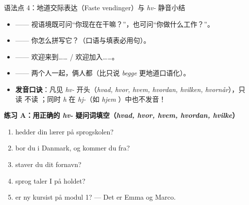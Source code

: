 \begin{grammatikbox}{语法点 4：地道交际表达（Faste vendinger）与 \textit{hv-} 静音小结}
\begin{itemize}
  \item {} —— 视语境既可问“你现在在干嘛？”，也可问“你做什么工作？”。
  \item {} —— 你怎么拼写它？（口语与填表必用句）。
  \item {} —— 欢迎来到…… / 欢迎加入……。
  \item {} —— 两个人一起，俩人都（比只说 \textit{begge} 更地道口语化）。
  \item \textbf{发音口诀}：凡见 \textit{hv-} 开头（\textit{hvad, hvor, hvem, hvordan, hvilken, hvornår}），只读  不读 ；同时 \textit{h} 在 \textit{hj-}（如 \textit{hjem} ）中也不发音！
\end{itemize}
\end{grammatikbox}


\textbf{练习 A：用正确的 \textit{hv-} 疑问词填空（\textit{hvad, hvor, hvem, hvordan, hvilke}）}
\begin{enumerate}
  \item \underline{\hspace{2.2cm}} hedder din lærer på sprogskolen?
  \item \underline{\hspace{2.2cm}} bor du i Danmark, og \underline{\hspace{2.2cm}} kommer du fra?
  \item \underline{\hspace{2.2cm}} staver du dit fornavn?
  \item \underline{\hspace{2.2cm}} sprog taler I på holdet?
  \item \underline{\hspace{2.2cm}} er ny kursist på modul 1? --- Det er Emma og Marco.
\end{enumerate}


